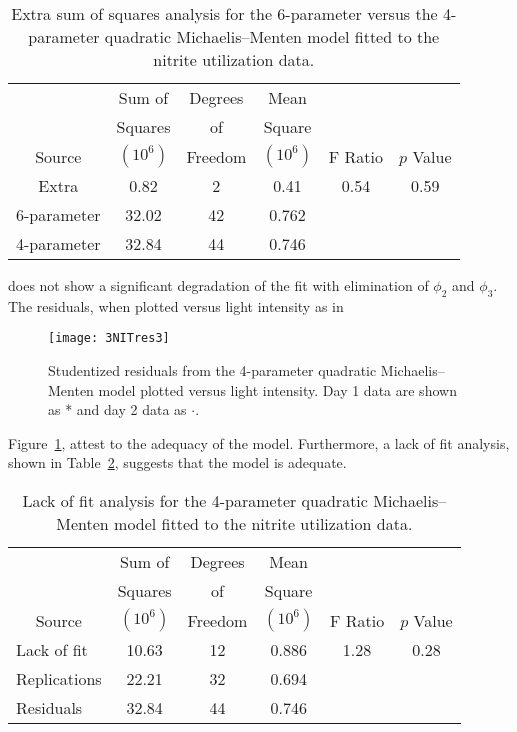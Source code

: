 \begin{table}
  \caption{
  Extra sum of squares analysis for the 6-parameter
  versus the 4-parameter quadratic Michaelis--Menten model
  fitted to the nitrite utilization data.
  }\label{tbl:3.7}
  \begin{center}
    \begin{tabular}{cccccc}\hline
      &\multicolumn{1}{c}{Sum of}&\multicolumn{1}{c}{Degrees}&
      \multicolumn{1}{c}{Mean}\\
      &\multicolumn{1}{c}{Squares} &\multicolumn{1}{c}{of}
      &\multicolumn{1}{c}{Square}\\ 
      \multicolumn{1}{c}{Source}&\multicolumn{1}{c}{$( 10^6 )$}
      &\multicolumn{1}{c}{Freedom}&\multicolumn{1}{c}{$( 10^6 )$}
      &\multicolumn{1}{c}{F Ratio} &\multicolumn{1}{c}{$p$ Value}\\ \hline
      Extra&0.82&2&0.41&0.54&0.59\\
      6-parameter&32.02&42&0.762\\ \hline
      4-parameter&32.84&44&0.746\\ \hline
    \end{tabular}
  \end{center}
\end{table}
does not show a significant degradation of the fit with
elimination of $\phi_{2}$ and $\phi_{3}$.
The residuals, when plotted versus light intensity as in
\begin{figure}
  \centerline{\texttt{[image: 3NITres3]}}%
  \caption{Studentized residuals from the 4-parameter quadratic
    Michaelis--Menten model plotted versus light intensity.  Day 1
    data are shown as * and day 2 data as $\cdot$.}
  \label{fig:NITres3}
\end{figure}
Figure~\ref{fig:NITres3}, attest to the adequacy of the model.
Furthermore, a lack of fit analysis, shown in
Table~\ref{tbl:qmic4lof}, suggests that the model is adequate.
\begin{table}
  \caption{Lack of fit analysis for the 4-parameter quadratic
    Michaelis--Menten model fitted to the nitrite utilization data.}
  \label{tbl:qmic4lof}
  \begin{center}
    \begin{tabular}{lccccc}\hline
      &\multicolumn{1}{c}{Sum of}&\multicolumn{1}{c}{Degrees}
      &\multicolumn{1}{c}{Mean}\\
      &\multicolumn{1}{c}{Squares} &\multicolumn{1}{c}{of} &
      \multicolumn{1}{c}{Square}\\
      \multicolumn{1}{c}{Source} & \multicolumn{1}{c}{$( 10^6 )$}
      &\multicolumn{1}{c}{Freedom} & \multicolumn{1}{c}{$( 10^6 )$} &
      \multicolumn{1}{c}{F Ratio} & \multicolumn{1}{c}{$p$ Value}\\ \hline
      Lack of fit&10.63&12&0.886&1.28&0.28\\
      Replications&22.21&32&0.694\\ \hline
      Residuals&32.84&44&0.746\\ \hline
    \end{tabular}
  \end{center}
\end{table}

